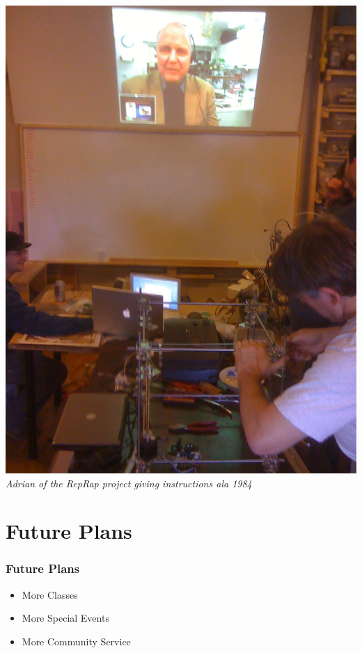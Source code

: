 \documentclass[notes]{beamer}
\begin{document}
\begin{frame}
  \begin{center}
  \includegraphics[height=.8\textheight]{reprap-adrian.jpg}\\
  {\small {\em Adrian of the RepRap project giving instructions ala 1984}}
\end{center}
\end{frame}

\section{Future Plans}

\begin{frame}
  \frametitle{Future Plans}
  \begin{itemize}
  \item More Classes
  \item More Special Events
  \item More Community Service
  \end{itemize}
\end{frame}
\end{document}
